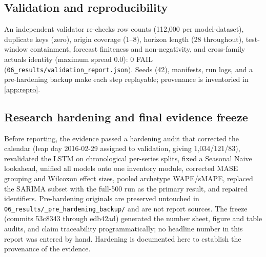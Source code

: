 \subsection{Validation and reproducibility}
\label{sec:validation}
An independent validator re-checks row counts (112,000 per model-dataset),
duplicate keys (zero), origin coverage (1--8), horizon length (28 throughout),
test-window containment, forecast finiteness and non-negativity, and
cross-family actuals identity (maximum spread 0.0): 0 FAIL
(\texttt{06\_results/validation\_report.json}). Seeds (42), manifests, run
logs, and a pre-hardening backup make each step replayable; provenance is
inventoried in \cref{app:repro}.

\subsection{Research hardening and final evidence freeze}
\label{sec:hardening}
Before reporting, the evidence passed a hardening audit that corrected the
calendar (leap day 2016-02-29 assigned to validation, giving 1,034/121/83),
revalidated the LSTM on chronological per-series splits, fixed a Seasonal
Naive lookahead, unified all models onto one inventory module, corrected MASE
grouping and Wilcoxon effect sizes, pooled archetype WAPE/sMAPE, replaced the
SARIMA subset with the full-500 run as the primary result, and repaired
identifiers. Pre-hardening originals are preserved untouched in
\texttt{06\_results/\_pre\_hardening\_backup/} and are not report sources.
The freeze (commits 53c8343 through edb42ad) generated the number sheet,
figure and table audits, and claim traceability programmatically; no headline
number in this report was entered by hand. Hardening is documented here to
establish the provenance of the evidence.
